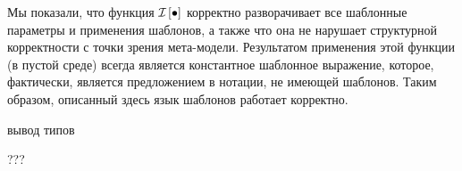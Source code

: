 Мы показали, что функция $\mathcal{I}_{} \left[ \bullet \right]$ корректно разворачивает все шаблонные параметры и применения шаблонов, а также что она не нарушает структурной корректности с точки зрения мета-модели. Результатом применения этой функции (в пустой среде) всегда является константное шаблонное выражение, которое, фактически, является предложением в нотации, не имеющей шаблонов. Таким образом, описанный здесь язык шаблонов работает корректно.

вывод типов

???

